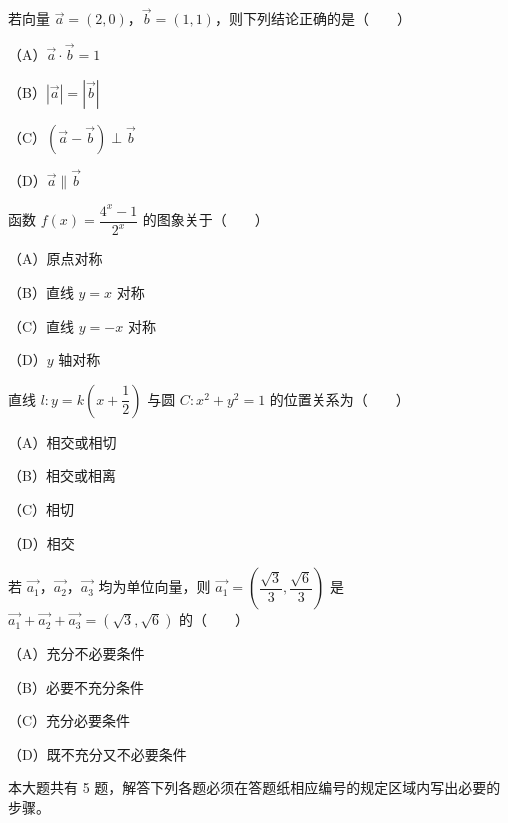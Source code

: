 \begin{question}
若向量 $\overrightarrow a=(2,0)$，$\overrightarrow b=(1,1)$，则下列结论正确的是\mbox{（　　）}

（A）$\overrightarrow a\cdot\overrightarrow b=1$

（B）$|\overrightarrow a|=|\overrightarrow b|$

（C）$(\overrightarrow a-\overrightarrow b)\perp\overrightarrow b$

（D）$\overrightarrow a\parallel\overrightarrow b$

\end{question}
\begin{question}
函数 $f(x)=\dfrac{4^x-1}{2^x}$ 的图象关于\mbox{（　　）}

（A）原点对称

（B）直线 $y=x$ 对称

（C）直线 $y=-x$ 对称

（D）$y$ 轴对称

\end{question}
\begin{question}
直线 $l:y=k\left(x+\dfrac12\right)$ 与圆 $C:x^2+y^2=1$ 的位置关系为\mbox{（　　）}

（A）相交或相切

（B）相交或相离

（C）相切

（D）相交

\end{question}
\begin{question}
若 $\overrightarrow{a_1}$，$\overrightarrow{a_2}$，$\overrightarrow{a_3}$ 均为单位向量，则 $\overrightarrow{a_1}=\left(\dfrac{\sqrt3}3,\dfrac{\sqrt6}3\right)$ 是 $\overrightarrow{a_1}+\overrightarrow{a_2}+\overrightarrow{a_3}=(\sqrt3,\sqrt6)$ 的\mbox{（　　）}

（A）充分不必要条件

（B）必要不充分条件

（C）充分必要条件

（D）既不充分又不必要条件

\end{question}

本大题共有 5 题，解答下列各题必须在答题纸相应编号的规定区域内写出必要的步骤。

